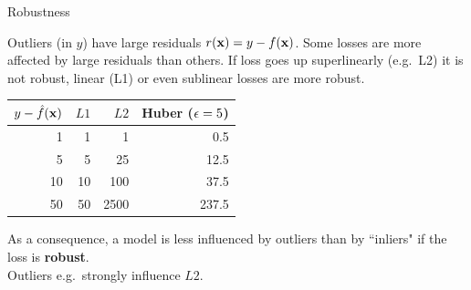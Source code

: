\documentclass[11pt,compress,t,notes=noshow, xcolor=table]{beamer}
\begin{document}
\begin{vbframe}{Robustness}

\small

Outliers (in $y$) have large residuals $r(\mathbf{x}) = y - f(\mathbf{x})$. Some losses are more
affected by large residuals than others. If loss goes up superlinearly (e.g.\ L2) it is not robust, linear (L1) or even sublinear losses are more robust.

\vspace{0.5cm}

\begin{minipage}[c]{0.5\textwidth}
  \footnotesize
  \begin{table}[]
  \begin{tabular}{r|r|r|r}
  \toprule
  $y - \hat{f}(\mathbf{x})$ & $L1$ & $L2$ & Huber ($\epsilon = 5$) \\ \hline
  1 & 1 & 1 & 0.5 \\
  5 & 5 & 25 & 12.5 \\
  10 & 10 & 100 & 37.5 \\
  50 & 50 & 2500  & 237.5
\end{tabular}
\end{table}
\end{minipage}%
\begin{minipage}[c]{0.05\textwidth}
  \phantom{foo}
\end{minipage}%
\begin{minipage}[c]{0.45\textwidth}
  \small
  As a consequence, a model is less influenced by outliers than by ``inliers" if 
  the loss is \textbf{robust}.\\
  Outliers e.g.\ strongly influence $L2$.
\end{minipage}%

\vfill



\end{vbframe}
\end{document}
